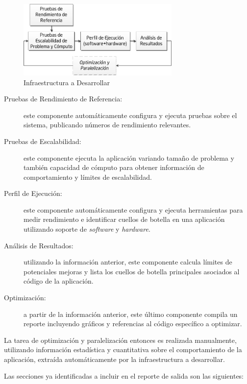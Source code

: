 \documentclass[a4paper]{article}
\begin{document}
\begin{figure}[H]
\centering
\includegraphics[width=8cm]{framework.png}
\caption{Infraestructura a Desarrollar}
\label{fig:framework}
\end{figure}
  \begin{description}
  \item[Pruebas de Rendimiento de Referencia:] este componente automáticamente configura y ejecuta pruebas sobre el sistema, publicando números de rendimiento relevantes.
 \item[Pruebas de Escalabilidad:] este componente ejecuta la aplicación variando tamaño de problema y también capacidad de cómputo para obtener información de comportamiento y límites de escalabilidad.
  \item[Perfil de Ejecución:] este componente automáticamente configura y ejecuta herramientas para medir rendimiento e identificar cuellos de botella en una aplicación utilizando soporte de {\it software} y {\it hardware}.
  \item[Análisis de Resultados:] utilizando la información anterior, este componente calcula límites de potenciales mejoras y lista los cuellos de botella principales asociados al código de la aplicación.
  \item[Optimización:] a partir de la información anterior, este último componente compila un reporte incluyendo gráficos y referencias al código específico a optimizar.
  \end{description}

La tarea de optimización y paralelización entonces es realizada manualmente, utilizando información estadística y cuantitativa sobre el comportamiento de la aplicación, extraída automáticamente por la infraestructura a desarrollar. 

\bigskip

Las secciones ya identificadas a incluir en el reporte de salida son las siguientes:
\end{document}
